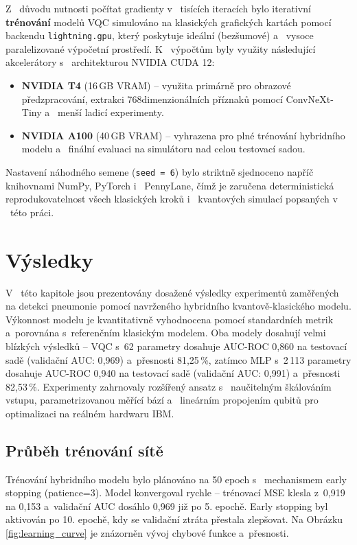 \documentclass[12pt, a4paper]{report}
\begin{document}
Z ~důvodu nutnosti počítat gradienty v ~tisících iteracích bylo iterativní \textbf{trénování} modelů VQC simulováno na klasických grafických kartách pomocí backendu \texttt{lightning.gpu}, který poskytuje ideální (bezšumové) a ~vysoce paralelizované výpočetní prostředí. K ~výpočtům byly využity následující akcelerátory s ~architekturou NVIDIA CUDA 12:
\begin{itemize}
    \item \textbf{NVIDIA T4} (16\,GB VRAM) -- využita primárně pro obrazové předzpracování, extrakci 768dimenzionálních příznaků pomocí ConvNeXt-Tiny a ~menší ladicí experimenty.
    \item \textbf{NVIDIA A100} (40\,GB VRAM) -- vyhrazena pro plné trénování hybridního modelu a ~finální evaluaci na simulátoru nad celou testovací sadou.
\end{itemize}

Nastavení náhodného semene (\texttt{seed = 6}) bylo striktně sjednoceno napříč knihovnami NumPy, PyTorch i ~PennyLane, čímž je zaručena deterministická reprodukovatelnost všech klasických kroků i ~kvantových simulací popsaných v ~této práci.

\chapter{Výsledky} \label{chap:vysledky}

V ~této kapitole jsou prezentovány dosažené výsledky experimentů zaměřených na detekci pneumonie pomocí navrženého hybridního kvantově-klasického modelu. Výkonnost modelu je kvantitativně vyhodnocena pomocí standardních metrik a~porovnána s~referenčním klasickým modelem. Oba modely dosahují velmi blízkých výsledků -- VQC s~62 parametry dosahuje AUC-ROC 0{,}860 na testovací sadě (validační AUC: 0{,}969) a~přesnosti 81{,}25\,\%, zatímco MLP s~2\,113 parametry dosahuje AUC-ROC 0{,}940 na testovací sadě (validační AUC: 0{,}991) a~přesnosti 82{,}53\,\%. Experimenty zahrnovaly rozšířený ansatz s ~naučitelným škálováním vstupu, parametrizovanou měřící bází a ~lineárním propojením qubitů pro optimalizaci na reálném hardwaru IBM.

\section{Průběh trénování sítě}
Trénování hybridního modelu bylo plánováno na 50 epoch s ~mechanismem early stopping (patience=3). Model konvergoval rychle -- trénovací MSE klesla z~0{,}919 na 0{,}153 a~validační AUC dosáhlo 0{,}969 již po 5. epochě. Early stopping byl aktivován po 10. epochě, kdy se validační ztráta přestala zlepšovat. Na Obrázku \ref{fig:learning_curve} je znázorněn vývoj chybové funkce a~přesnosti.
\end{document}
